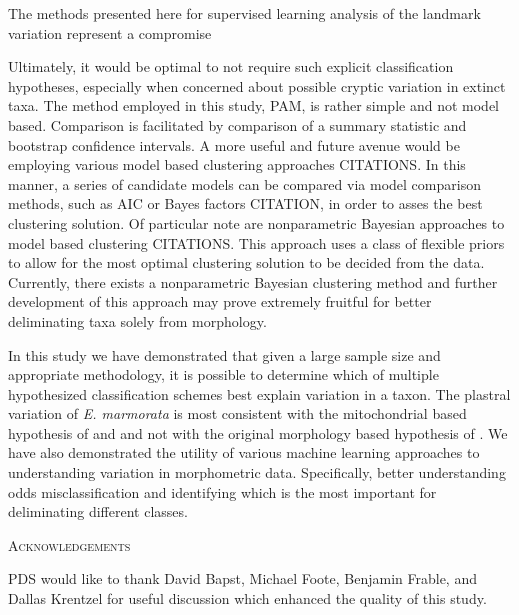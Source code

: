 \documentclass[12pt,letterpaper]{article}\usepackage{graphicx, color}
\renewcommand{\section}[1]{%
\bigskip
\begin{center}
\begin{Large}
\normalfont\scshape #1
\medskip
\end{Large}
\end{center}}
\begin{document}
The methods presented here for supervised learning analysis of the landmark variation represent a compromise

Ultimately, it would be optimal to not require such explicit classification hypotheses, especially when concerned about possible cryptic variation in extinct taxa. The method employed in this study, PAM, is rather simple and not model based. Comparison is facilitated by comparison of a summary statistic and bootstrap confidence intervals. A more useful and future avenue would be employing various model based clustering approaches CITATIONS. In this manner, a series of candidate models can be compared via model comparison methods, such as AIC or Bayes factors CITATION, in order to asses the best clustering solution. Of particular note are nonparametric Bayesian approaches to model based clustering CITATIONS. This approach uses a class of flexible priors to allow for the most optimal clustering solution to be decided from the data. Currently, there exists a nonparametric Bayesian clustering method and further development of this approach may prove extremely fruitful for better deliminating taxa solely from morphology.


In this study we have demonstrated that given a large sample size and appropriate methodology, it is possible to determine which of multiple hypothesized classification schemes best explain variation in a taxon. The plastral variation of \textit{E. marmorata} is most consistent with the mitochondrial based hypothesis of \citet{Spinks2005} and \citet{Spinks2010} and not with the original morphology based hypothesis of \citet{Seeliger1945}. We have also demonstrated the utility of various machine learning approaches to understanding variation in morphometric data. Specifically, better understanding odds misclassification and identifying which is the most important for deliminating different classes.

\section{Acknowledgements}
PDS would like to thank David Bapst, Michael Foote, Benjamin Frable, and Dallas Krentzel for useful discussion which enhanced the quality of this study.



\end{document}
